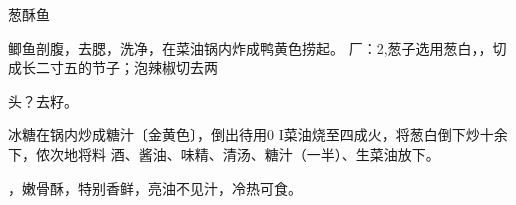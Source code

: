\begin{recipe}{葱酥鱼}

\ingredients


\cooking

\step 鲫鱼剖腹，去腮，洗净，在菜油锅内炸成鸭黄色捞起。 厂：2,葱子选用葱白，，切成长二寸五的节子；泡辣椒切去两

头？去籽。

\step 冰糖在锅内炒成糖汁〔金黄色〕，倒出待用0 I菜油烧至四成火，将葱白倒下炒十余下，侬次地将料 酒、酱油、味精、清汤、糖汁（一半）、生菜油放下。

\notes

，嫩骨酥，特别香鲜，亮油不见汁，冷热可食。

\end{recipe}

